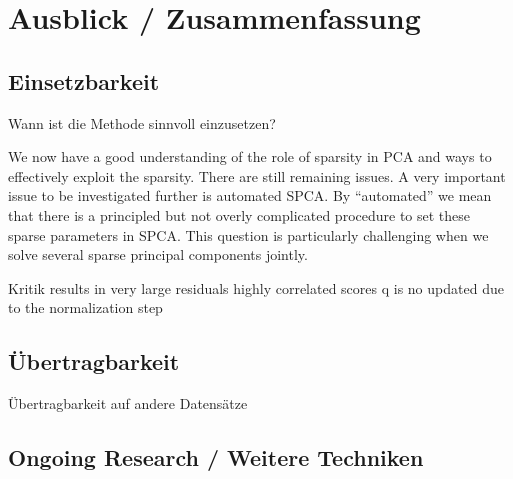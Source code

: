 \chapter{Ausblick / Zusammenfassung}

\label{conclusion}

\section{Einsetzbarkeit}
Wann ist die Methode sinnvoll einzusetzen?

We now have a good understanding of the role of
sparsity in PCA and ways to effectively exploit the sparsity.
There are still remaining issues. A very important issue to
be investigated further is automated SPCA. By “automated”
we mean that there is a principled but not overly complicated
procedure to set these sparse parameters in SPCA.
This question is particularly challenging when we solve
several sparse principal components jointly.

Kritik 
results in very large residuals
highly correlated scores
q is no updated due to the normalization step

\section{Übertragbarkeit}
Übertragbarkeit auf andere Datensätze

\section{Ongoing Research / Weitere Techniken}